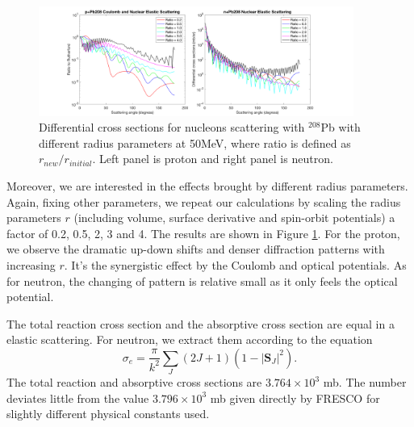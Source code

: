     \begin{figure}[t]
		\centering
		\includegraphics[width=0.92\textwidth]{7.png}
		\caption{Differential cross sections for nucleons scattering with $^{208}$Pb with different radius parameters at 50MeV, where ratio is defined as $r_{new}/r_{initial}$. Left panel is proton and right panel is neutron.  }
		\label{fig:radiusparameter}
	\end{figure}

	Moreover, we are interested in the effects brought by different radius parameters. Again, fixing other parameters, we repeat our calculations by scaling the radius parameters $r$ (including volume, surface derivative and spin-orbit potentials) a factor of 0.2, 0.5, 2, 3 and 4. The results are shown in Figure \ref{fig:radiusparameter}. For the proton, we observe the dramatic up-down shifts and denser diffraction patterns with increasing $r$. It's the synergistic effect by the Coulomb and optical potentials. As for neutron, the changing of pattern is relative small as it only feels the optical potential. 
	
	The total reaction cross section and the absorptive cross section are equal in a elastic scattering. For neutron, we extract them according to the equation
	\begin{equation}\label{ruther}
		\sigma_{e}=\frac{\pi}{k^2}\sum_{J}(2J+1)(1-|\mathbf{S}_J|^2).
			\end{equation}
	The total reaction and absorptive cross sections are $3.764\times 10^3$ mb. The number deviates little from the value $3.796\times 10^3$ mb given directly by FRESCO for slightly different physical constants used.
	
